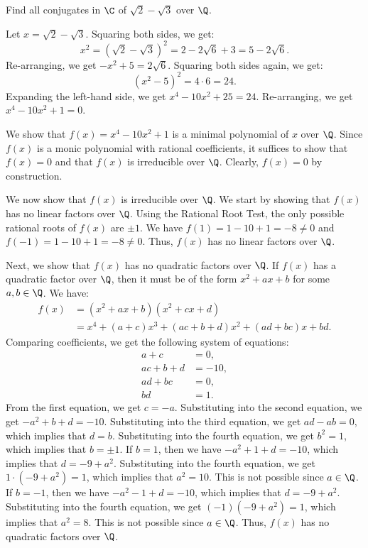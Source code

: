 
\begin{problem}[43.4]
  Find all conjugates in $\C$ of $\sqrt{2} - \sqrt{3}$ over $\Q$.
\end{problem}

\begin{solution}
  Let $x = \sqrt{2} - \sqrt{3}$. Squaring both sides, we get:
  \[%
    x^2 = (\sqrt{2} - \sqrt{3})^2 = 2 - 2\sqrt{6} + 3 = 5 - 2\sqrt{6}
  .\]%
  Re-arranging, we get $-x^2 + 5 = 2\sqrt{6}$. Squaring both sides again, we get:
  \[%
    (x^2 - 5)^2 = 4 \cdot 6 = 24
  .\]%
  Expanding the left-hand side, we get $x^4 - 10x^2 + 25 = 24$. Re-arranging, we get $x^4 - 10x^2 + 1 = 0$.

  We show that $f(x) = x^4 - 10x^2 + 1$ is a minimal polynomial of $x$ over $\Q$. Since $f(x)$ is a monic polynomial with rational coefficients, it suffices to show that $f(x) = 0$ and that $f(x)$ is irreducible over $\Q$. Clearly, $f(x) = 0$ by construction.

  We now show that $f(x)$ is irreducible over $\Q$. We start by showing that $f(x)$ has no linear factors over $\Q$. Using the Rational Root Test, the only possible rational roots of $f(x)$ are $\pm 1$. We have $f(1) = 1 - 10 + 1 = -8 \neq 0$ and $f(-1) = 1 - 10 + 1 = -8 \neq 0$. Thus, $f(x)$ has no linear factors over $\Q$.

  Next, we show that $f(x)$ has no quadratic factors over $\Q$. If $f(x)$ has a quadratic factor over $\Q$, then it must be of the form $x^2 + ax + b$ for some $a, b \in \Q$. We have:
  \begin{align*}
    f(x) &= (x^2 + ax + b)(x^2 + cx + d) \\
    &= x^4 + (a + c)x^3 + (ac + b + d)x^2 + (ad + bc)x + bd
  .\end{align*}
  Comparing coefficients, we get the following system of equations:
  \begin{align*}
    a + c &= 0, \\
    ac + b + d &= -10, \\
    ad + bc &= 0, \\
    bd &= 1
  .\end{align*}
  From the first equation, we get $c = -a$. Substituting into the second equation, we get $-a^2 + b + d = -10$. Substituting into the third equation, we get $ad - ab = 0$, which implies that $d = b$. Substituting into the fourth equation, we get $b^2 = 1$, which implies that $b = \pm 1$. If $b = 1$, then we have $-a^2 + 1 + d = -10$, which implies that $d = -9 + a^2$. Substituting into the fourth equation, we get $1 \cdot (-9 + a^2) = 1$, which implies that $a^2 = 10$. This is not possible since $a \in \Q$. If $b = -1$, then we have $-a^2 - 1 + d = -10$, which implies that $d = -9 + a^2$. Substituting into the fourth equation, we get $(-1)(-9 + a^2) = 1$, which implies that $a^2 = 8$. This is not possible since $a \in \Q$. Thus, $f(x)$ has no quadratic factors over $\Q$.


\end{solution}
